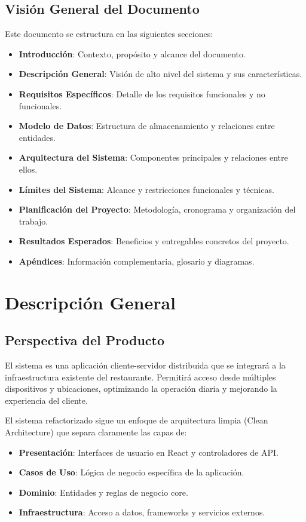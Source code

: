 \documentclass[12pt]{article}
\begin{document}
\subsection{Visión General del Documento}
Este documento se estructura en las siguientes secciones:
\begin{itemize}
  \item \textbf{Introducción}: Contexto, propósito y alcance del documento.
  \item \textbf{Descripción General}: Visión de alto nivel del sistema y sus características.
  \item \textbf{Requisitos Específicos}: Detalle de los requisitos funcionales y no funcionales.
  \item \textbf{Modelo de Datos}: Estructura de almacenamiento y relaciones entre entidades.
  \item \textbf{Arquitectura del Sistema}: Componentes principales y relaciones entre ellos.
  \item \textbf{Límites del Sistema}: Alcance y restricciones funcionales y técnicas.
  \item \textbf{Planificación del Proyecto}: Metodología, cronograma y organización del trabajo.
  \item \textbf{Resultados Esperados}: Beneficios y entregables concretos del proyecto.
  \item \textbf{Apéndices}: Información complementaria, glosario y diagramas.
\end{itemize}

\section{Descripción General}
\subsection{Perspectiva del Producto}
El sistema es una aplicación cliente-servidor distribuida que se integrará a la infraestructura existente del restaurante. Permitirá acceso desde múltiples dispositivos y ubicaciones, optimizando la operación diaria y mejorando la experiencia del cliente.

El sistema refactorizado sigue un enfoque de arquitectura limpia (Clean Architecture) que separa claramente las capas de:
\begin{itemize}
  \item \textbf{Presentación}: Interfaces de usuario en React y controladores de API.
  \item \textbf{Casos de Uso}: Lógica de negocio específica de la aplicación.
  \item \textbf{Dominio}: Entidades y reglas de negocio core.
  \item \textbf{Infraestructura}: Acceso a datos, frameworks y servicios externos.
\end{itemize}
\end{document}
